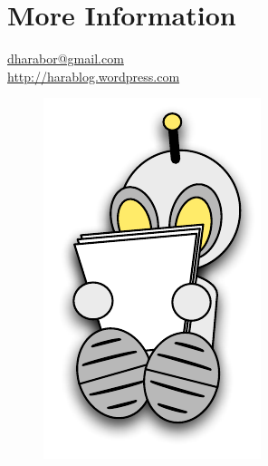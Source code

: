 
\section{More Information}
{\Huge \url{dharabor@gmail.com } } \newline \\ 
{ \Huge \url{http://harablog.wordpress.com }}


 \begin{figure}[b]
 \centering
		\includegraphics[width=0.3\columnwidth]{diagrams/robot_reading.pdf}
 \end{figure}
